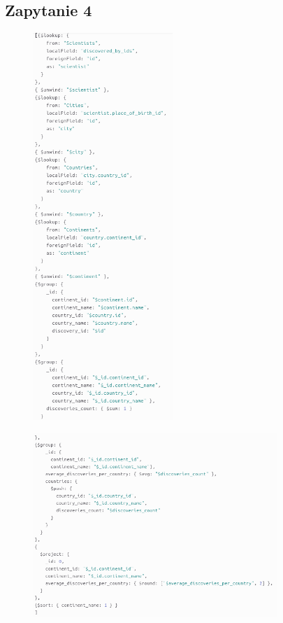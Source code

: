 \documentclass[11pt]{article}
\begin{document}
	\subsection{Zapytanie 4}
		\begin{figure}[!ht]
			\begin{center}
				\includegraphics[width=200px]{m4_1.png}
			\end{center}
		\end{figure}
		
\newpage
		\begin{figure}[!ht]
			\begin{center}
				\includegraphics[width=350px]{m4_2.png}
			\end{center}
		\end{figure}
	
\end{document}
